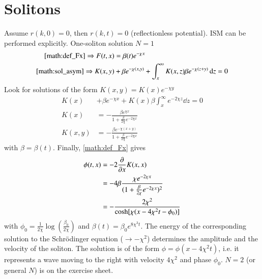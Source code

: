 \section{Solitons}
Assume $r(k, 0) = 0$, then $r(k, t)=0$ (reflectionless potential). ISM can be performed explicitly. One-soliton solution $N=1$ 
\begin{align*}
	\eqref{math:def_Fx} \Rightarrow F(t, x) &= \beta (t) e^{-\chi x} \\
	\eqref{math:sol_asym} \Rightarrow K(x, y) &+ \beta e^{-\chi(x, y)} + \int_{x}^{\infty} K(x, z) \beta e^{-\chi (z+y)} \dd{z} = 0
\end{align*}
Look for solutions of the form $K(x, y) = K(x) e^{-\chi y}$
\begin{align*}
	K(x) &+ \beta e^{-\chi x} + K(x) \beta \int_x^{\infty} e^{-2\chi z} \dd{z} = 0 \\
	K(x) &= - \frac{\beta e^{\chi x}}{1 + \frac{\beta}{2 \chi} e^{-2\chi x}} \\
	K(x, y) &= - \frac{\beta e^{-\chi(x+y)}}{1+\frac{\beta}{2\chi}e^{-2\chi x}}
\end{align*}
with $\beta = \beta(t)$. Finally, \eqref{math:def_Fx} gives
\begin{align*}
	\phi(t, x) &= -2 \pdv{x} K(x, x)  \\
				  &= -4 \beta \frac{\chi e^{-2\chi x}}{(1+\frac{\beta}{2\chi} e^{-2\chi x})^2} \\
				  &= - \frac{2 \chi^2}{\cosh[\chi(x - 4 \chi^2t - \phi_0)]}
\end{align*}
with $\phi_0 = \frac{1}{2\chi} \log(\frac{\beta_0}{2\chi})$ and $\beta(t) = \beta_0 e^{8 \chi^3 t}$. The energy of the corresponding solution to the Schrödinger equation ($\rightarrow - \chi^2$) determines the amplitude and the velocity of the soliton. The solution is of the form $\phi = \phi(x-4\chi^2 t)$, i.e. it represents a wave moving to the right with velocity $4\chi^2$ and phase $\phi_0$.
$N=2$ (or general $N$) is on the exercise sheet.


